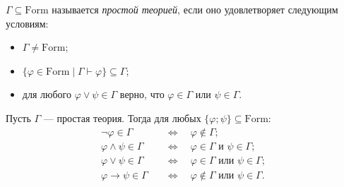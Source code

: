 \documentclass[12pt,a4paper]{article}
\newcommand{\Formul}{\ensuremath{\mathrm{Form}}\xspace}
\begin{document}
    \begin{definition}
        $\Gamma \subseteq \Formul$ называется \emph{простой теорией}, если оно удовлетворяет следующим условиям:
        \begin{itemize}
            \item $\Gamma \neq \Formul$;
            \item $\{\varphi \in \Formul \mid \Gamma \vdash \varphi\} \subseteq \Gamma$;
            \item для любого $\varphi \vee \psi \in \Gamma$ верно, что $\varphi \in \Gamma$ или $\psi \in \Gamma$.
        \end{itemize}
    \end{definition}

    \begin{lemma}
        Пусть $\Gamma$ --- простая теория. Тогда для любых $\{\varphi; \psi\} \subseteq \Formul$:
        \begin{align*}
            \neg \varphi \in \Gamma \quad &\Longleftrightarrow \quad \varphi \notin \Gamma;\\
            \varphi \wedge \psi \in \Gamma \quad &\Longleftrightarrow \quad \varphi \in \Gamma \text{ и } \psi \in \Gamma;\\
            \varphi \vee \psi \in \Gamma \quad &\Longleftrightarrow \quad \varphi \in \Gamma \text{ или } \psi \in \Gamma;\\
            \varphi \rightarrow \psi \in \Gamma \quad &\Longleftrightarrow \quad \varphi \notin \Gamma \text{ или } \psi \in \Gamma.\\
        \end{align*}
    \end{lemma}
\end{document}
